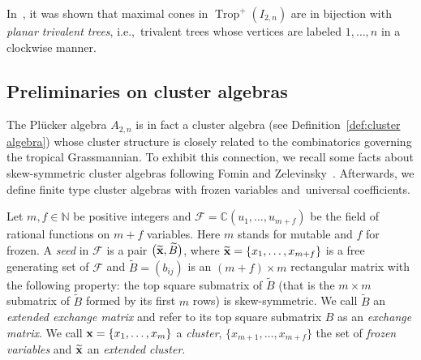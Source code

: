 \documentclass[pdftex]{sigma}%
\numberwithin{equation}{section}
\DeclareMathOperator{\trop}{Trop}
\begin{document}
In~\cite[Section~5]{SW05}, it was shown that
maximal cones in $\trop^+(I_{2,n})$ are in bijection with {\it planar trivalent trees}, i.e.,~trivalent trees whose vertices are labeled $1,\dots,n$ in a clockwise manner.

\subsection{Preliminaries on cluster algebras}\label{sec:cluster}

The Pl\"ucker algebra $A_{2,n}$ is in fact a cluster algebra (see Definition~\ref{def:cluster algebra}) whose cluster structure is closely related to the combinatorics governing the tropical Grassmannian.
To exhibit this con\-nection, we recall some facts about skew-symmetric cluster algebras following Fomin and Zelevinsky~\cite{FZ02,FZ_clustersIV}.
Afterwards, we define finite type cluster algebras with frozen variables and~universal coefficients.

Let $m,f\in \mathbb N$ be positive integers and $\mathcal{F} =\mathbb{C}(u_1, \dots ,u_{m+f})$ be the field of rational functions on $m+f$ variables.
Here $m$ stands for mutable and $f$ for frozen.
A {\it seed} in $\mathcal{F}$ is a pair $\big(\widetilde{{\bf x}},\widetilde{B}\big)$, where $\widetilde{{\bf x}}=\{x_1,\dots, x_{m+f}\}$ is a free generating set of $\mathcal F$ and $\widetilde{B}=(b_{ij})$ is an $(m+f)\times m$ rectangular matrix with the following property: the top square submatrix of $\widetilde{B}$ (that is the $m\times m$ submatrix of $\widetilde{B}$ formed by its first $m$ rows) is skew-symmetric.
We call $\widetilde{B} $ an {\it extended exchange matrix} and refer to its top square submatrix $B$ as an {\it exchange matrix}.
We call ${\bf x}=\{x_1, \dots , x_m \}$ a {\it cluster}, $\{x_{m+1}, \dots , x_{m+f} \}$ the set of {\it frozen variables} and $\widetilde{{\bf x}}$ an {\it extended cluster}.
\end{document}

